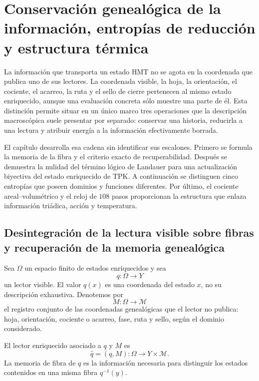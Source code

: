 \chapter{Conservación genealógica de la información, entropías de reducción y estructura térmica}
\label{chap:informacion-entropia-landauer}

La información que transporta un estado HMT no se agota en la coordenada que
publica uno de sus lectores. La coordenada visible, la hoja, la orientación,
el cociente, el acarreo, la ruta y el sello de cierre pertenecen al mismo
estado enriquecido, aunque una evaluación concreta sólo muestre una parte de
él. Esta distinción permite situar en un único marco tres operaciones que la
descripción macroscópica suele presentar por separado: conservar una historia,
reducirla a una lectura y atribuir energía a la información efectivamente
borrada.

El capítulo desarrolla esa cadena sin identificar sus escalones. Primero se
formula la memoria de la fibra y el criterio exacto de recuperabilidad. Después
se demuestra la nulidad del término lógico de Landauer para una actualización
biyectiva del estado enriquecido de TPK. A continuación se distinguen cinco
entropías que poseen dominios y funciones diferentes. Por último, el cociente
areal--volumétrico y el reloj de \(108\) pasos proporcionan la estructura que
enlaza información triádica, acción y temperatura.

\section{Desintegración de la lectura visible sobre fibras y recuperación de la memoria genealógica}

Sea \(\Omega\) un espacio finito de estados enriquecidos y sea
\[
 q:\Omega\longrightarrow Y
\]
un lector visible. El valor \(q(x)\) es una coordenada del estado \(x\), no su
descripción exhaustiva. Denotemos por
\[
 M:\Omega\longrightarrow\mathcal M
\]
el registro conjunto de las coordenadas genealógicas que el lector no publica:
hoja, orientación, cociente o acarreo, fase, ruta y sello, según el dominio
considerado.

\begin{definition}
El lector enriquecido asociado a \(q\) y \(M\) es
\begin{equation}
 \widehat q=(q,M):\Omega\longrightarrow Y\times\mathcal M.
 \label{eq:lector-enriquecido-informacion}
\end{equation}
La memoria de fibra de \(q\) es la información necesaria para distinguir los
estados contenidos en una misma fibra \(q^{-1}(y)\).
\end{definition}

